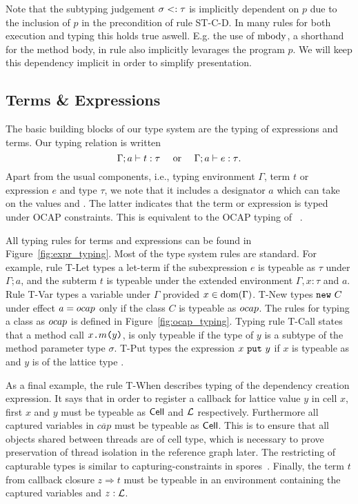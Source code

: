 \begin{remark}
  Note that the subtyping judgement $\sigma <: \tau$ is implicitly dependent
  on $p$ due to the inclusion of $p$ in the precondition of rule {\sc ST-C-D}.
  In many rules for both execution and typing this holds true aswell. E.g. the
  use of $\mbox{$\mathrm{mbody}$}$, a shorthand for the method body, in rule \ECall{} also
  implicitly levarages the program $p$. We will keep this dependency implicit in
  order to simplify presentation.
\end{remark}

\subsection{Terms \& Expressions}%
\label{sub:terms_and_expressions}

The basic building blocks of our type system are the typing of expressions and
terms. Our typing relation is written
\begin{equation}
  \mbox{$\Gamma;a\vdash t:\tau$} \quad \text{ or } \quad
  \mbox{$\Gamma;a\vdash e:\tau$}. \notag
\end{equation}
Apart from the usual components, i.e., typing environment $\Gamma$, term $t$ or
expression $e$ and type $\tau$, we note that it includes a designator $a$ which
can take on the values \nocap{} and \ocap{}. The latter indicates that the term
or expression is typed under OCAP constraints. This is equivalent to the OCAP
typing of \LaCasa{}~\parencite{conf/oopsla/HallerL16}. 

All typing rules for terms and expressions can be found in
Figure~\ref{fig:expr_typing}. Most of the type system rules are standard. For
example, rule {\sc T-Let} types a let-term if the subexpression $e$ is typeable
as $\tau$ under $\Gamma; a$, and the subterm $t$ is typeable under the extended
environment $\Gamma, x: \tau$ and $a$. Rule {\sc T-Var} types a variable under
$\Gamma$ provided $x \in \mbox{$\mathrm{dom}$}(\Gamma)$. {\sc T-New} types $\mbox{\mdseries\texttt{new}~$C$}$ under effect
$a = \mbox{$ocap$}$ only if the class $C$ is typeable as $\mbox{$ocap$}$. The rules for typing a
class as $\mbox{$ocap$}$ is defined in Figure~\ref{fig:ocap_typing}. Typing rule {\sc
T-Call} states that a method call $\mbox{\mdseries$x$\texttt{.}$m$\texttt{(}$y$\texttt{)}}$, is only typeable if the type
of $y$ is a subtype of the method parameter type $\sigma$. {\sc T-Put} types the
expression $\mbox{\mdseries$x$~\texttt{put}~$y$}$ if $x$ is typeable as \CellType{} and $y$ is of the lattice
type \LatType.

As a final example, the rule {\sc T-When} describes typing of the dependency
creation expression. It says that in order to register a callback for lattice
value $y$ in cell $x$, first $x$ and $y$ must be typeable as $\mbox{$\mathsf{Cell}$}$ and
$\mbox{$\mathcal{L}$}$ respectively. Furthermore all captured variables in $\overline{cap}$
must be typeable as $\mbox{$\mathsf{Cell}$}$. This is to ensure that all objects shared
between threads are of cell type, which is necessary to prove preservation of
thread isolation in the reference graph later. The restricting of capturable
types is similar to capturing-constraints in
spores~\parencite{conf/ecoop/MillerHO14}.  Finally, the term $t$ from callback
closure $z \Rightarrow t$ must be typeable in an environment containing the
captured variables and $z: \mbox{$\mathcal{L}$}$.



